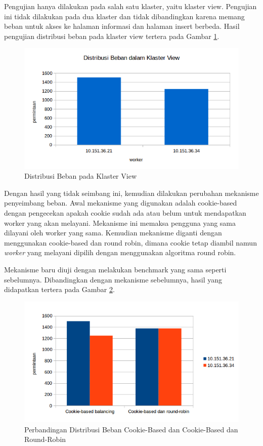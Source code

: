 \documentclass{ta-its}
\begin{document}
					Pengujian hanya dilakukan pada salah satu klaster, yaitu klaster view. Pengujian ini tidak dilakukan pada dua klaster dan tidak dibandingkan karena memang beban untuk akses ke halaman informasi dan halaman insert berbeda. Hasil pengujian distribusi beban pada klaster view tertera pada Gambar \ref{gambarDistribusi}.
					
					\begin{figure}[h] 
						\centering
						\includegraphics[width=0.8\linewidth]{contoh_img/distribusi}
						\caption{Distribusi Beban pada Klaster View}
						\label{gambarDistribusi}
					\end{figure}
					
					Dengan hasil yang tidak seimbang ini, kemudian dilakukan perubahan mekanisme penyeimbang beban. Awal mekanisme yang digunakan adalah cookie-based dengan pengecekan apakah cookie sudah ada atau belum untuk mendapatkan worker yang akan melayani. Mekanisme ini memaksa pengguna yang sama dilayani oleh worker yang sama. Kemudian mekanisme diganti dengan menggunakan cookie-based dan round robin, dimana cookie tetap diambil namun \textit{worker} yang melayani dipilih dengan menggunakan algoritma round robin.
					
					Mekanisme baru diuji dengan melakukan benchmark yang sama seperti sebelumnya. Dibandingkan dengan mekanisme sebelumnya, hasil yang didapatkan tertera pada Gambar \ref{gambarDistribusiBanding}.
					
					\begin{figure}[h] 
						\centering
						\includegraphics[width=0.8\linewidth]{contoh_img/banding-distribusi}
						\caption{Perbandingan Distribusi Beban Cookie-Based dan Cookie-Based dan Round-Robin}
						\label{gambarDistribusiBanding}
					\end{figure}
					
\end{document}
